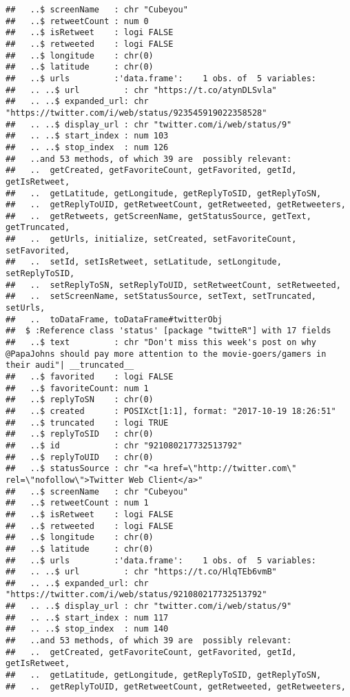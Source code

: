 \documentclass[]{article}
\begin{document}
\begin{verbatim}
##   ..$ screenName   : chr "Cubeyou"
##   ..$ retweetCount : num 0
##   ..$ isRetweet    : logi FALSE
##   ..$ retweeted    : logi FALSE
##   ..$ longitude    : chr(0) 
##   ..$ latitude     : chr(0) 
##   ..$ urls         :'data.frame':    1 obs. of  5 variables:
##   .. ..$ url         : chr "https://t.co/atynDLSvla"
##   .. ..$ expanded_url: chr "https://twitter.com/i/web/status/923545919022358528"
##   .. ..$ display_url : chr "twitter.com/i/web/status/9"
##   .. ..$ start_index : num 103
##   .. ..$ stop_index  : num 126
##   ..and 53 methods, of which 39 are  possibly relevant:
##   ..  getCreated, getFavoriteCount, getFavorited, getId, getIsRetweet,
##   ..  getLatitude, getLongitude, getReplyToSID, getReplyToSN,
##   ..  getReplyToUID, getRetweetCount, getRetweeted, getRetweeters,
##   ..  getRetweets, getScreenName, getStatusSource, getText, getTruncated,
##   ..  getUrls, initialize, setCreated, setFavoriteCount, setFavorited,
##   ..  setId, setIsRetweet, setLatitude, setLongitude, setReplyToSID,
##   ..  setReplyToSN, setReplyToUID, setRetweetCount, setRetweeted,
##   ..  setScreenName, setStatusSource, setText, setTruncated, setUrls,
##   ..  toDataFrame, toDataFrame#twitterObj
##  $ :Reference class 'status' [package "twitteR"] with 17 fields
##   ..$ text         : chr "Don't miss this week's post on why @PapaJohns should pay more attention to the movie-goers/gamers in their audi"| __truncated__
##   ..$ favorited    : logi FALSE
##   ..$ favoriteCount: num 1
##   ..$ replyToSN    : chr(0) 
##   ..$ created      : POSIXct[1:1], format: "2017-10-19 18:26:51"
##   ..$ truncated    : logi TRUE
##   ..$ replyToSID   : chr(0) 
##   ..$ id           : chr "921080217732513792"
##   ..$ replyToUID   : chr(0) 
##   ..$ statusSource : chr "<a href=\"http://twitter.com\" rel=\"nofollow\">Twitter Web Client</a>"
##   ..$ screenName   : chr "Cubeyou"
##   ..$ retweetCount : num 1
##   ..$ isRetweet    : logi FALSE
##   ..$ retweeted    : logi FALSE
##   ..$ longitude    : chr(0) 
##   ..$ latitude     : chr(0) 
##   ..$ urls         :'data.frame':    1 obs. of  5 variables:
##   .. ..$ url         : chr "https://t.co/HlqTEb6vmB"
##   .. ..$ expanded_url: chr "https://twitter.com/i/web/status/921080217732513792"
##   .. ..$ display_url : chr "twitter.com/i/web/status/9"
##   .. ..$ start_index : num 117
##   .. ..$ stop_index  : num 140
##   ..and 53 methods, of which 39 are  possibly relevant:
##   ..  getCreated, getFavoriteCount, getFavorited, getId, getIsRetweet,
##   ..  getLatitude, getLongitude, getReplyToSID, getReplyToSN,
##   ..  getReplyToUID, getRetweetCount, getRetweeted, getRetweeters,

\end{verbatim}
\end{document}
